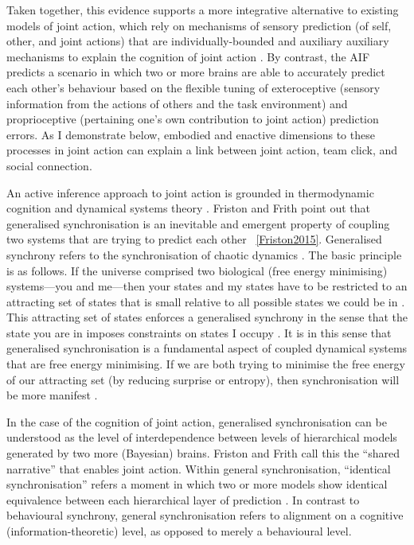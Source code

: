 \begin{CJK}{UTF8}{gbsn}
Taken together, this evidence supports a more integrative alternative to existing models of joint action, which rely on mechanisms of sensory prediction (of self, other, and joint actions) that are individually-bounded and auxiliary auxiliary mechanisms to explain the cognition of joint action \citep[][; for an AFM model of coordination in joint action, see Appendix ~\ref{app2:AFMapproachJA}]{Pesquita2017}.  By contrast, the AIF predicts a scenario in which two or more brains are able to accurately predict each other's behaviour based on the flexible tuning of exteroceptive (sensory information from the actions of others and the task environment) and proprioceptive (pertaining one's own contribution to joint action) prediction errors.  As I demonstrate below, embodied and enactive dimensions to these processes in joint action can explain a link between joint action, team click, and social connection.



An active inference approach to joint action is grounded in thermodynamic cognition and dynamical systems theory \citep{Friston2013}.  Friston and Frith point out that generalised synchronisation is an inevitable and emergent property of coupling two systems that are trying to predict each other ~\ref{Friston2015}.  Generalised synchrony refers to the synchronisation of chaotic dynamics \citep{Barreto2003}.  The basic principle is as follows.  If the universe comprised two biological (free energy minimising) systems---you and me---then your states and my states have to be restricted to an attracting set of states that is small relative to all possible states we could be in \citep{Friston2015}.  This attracting set of states enforces a generalised synchrony in the sense that the state you are in imposes constraints on states I occupy \citep{Richardson2015}.  It is in this sense that generalised synchronisation is a fundamental aspect of coupled dynamical systems that are free energy minimising.  If we are both trying to minimise the free energy of our attracting set (by reducing surprise or entropy), then synchronisation will be more manifest \citep{Friston2015a}.

In the case of the cognition of joint action, generalised synchronisation can be understood as the level of interdependence between levels of hierarchical models generated by two more (Bayesian) brains.  Friston and Frith call this the ``shared narrative'' that enables joint action.  Within general synchronisation, ``identical synchronisation'' refers a moment in which two or more models show identical equivalence between each hierarchical layer of prediction \citep{Friston2015}.   In contrast to behavioural synchrony, general synchronisation refers to alignment on a cognitive (information-theoretic) level, as opposed to merely a behavioural level.


\end{CJK}
